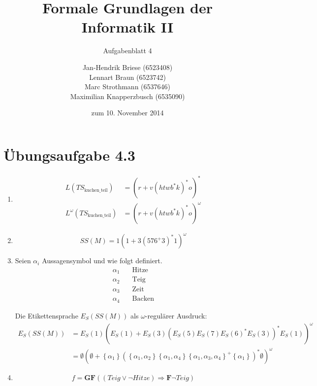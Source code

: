 \documentclass[a4paper]{scrartcl}
\title{Formale Grundlagen der Informatik II}
\subtitle{Aufgabenblatt 4}
\author{
    Jan-Hendrik Briese (6523408) \\
    Lennart Braun (6523742) \\
    Marc Strothmann (6537646) \\
    Maximilian Knapperzbusch (6535090)
}
\date{zum 10. November 2014}
\begin{document}
\maketitle

\section*{Übungsaufgabe 4.3} 
\begin{enumerate}
    \item
        \begin{align*}
            L(TS_\text{kuchen\_teil}) &= \left( r + v \left( htwb^*k \right)^* o \right)^* \\
            L^\omega(TS_\text{kuchen\_teil}) &= \left( r + v \left( htwb^*k \right)^* o \right)^\omega
        \end{align*}

    \item
        \begin{equation*}
            SS(M) = 1 \left( 1 + 3 \left( 576^+3 \right)^* 1 \right)^\omega
        \end{equation*}

    \item Seien $\alpha_i$ Aussagensymbol und wie folgt definiert.
        \begin{align*}
            \alpha_1 &\quad \text{Hitze} \\
            \alpha_2 &\quad \text{Teig} \\
            \alpha_3 &\quad \text{Zeit} \\
            \alpha_4 &\quad \text{Backen}
        \end{align*}

        Die Etikettensprache $E_S(SS(M))$ als $\omega$-regulärer Ausdruck:
        \begin{equation*}
            \begin{split}
                E_S(SS(M)) &= E_S(1) \left( E_S(1) + E_S(3) \left( E_S(5) E_S(7) E_S(6)^* E_S(3) \right)^* E_S(1) \right)^\omega \\
                &= \emptyset \left( \emptyset + \left\{ \alpha_1 \right\} \left( \left\{ \alpha_1, \alpha_2 \right\} \left\{ \alpha_1, \alpha_4 \right\} \left\{ \alpha_1, \alpha_3, \alpha_4 \right\}^+ \left\{ \alpha_1 \right\} \right)^* \emptyset \right)^\omega
            \end{split}
        \end{equation*}

    \item
        \begin{equation}
            f = \textbf{GF}((Teig \lor \lnot Hitze) \Rightarrow \textbf{F}\lnot Teig)
        \end{equation}
        

\end{enumerate}
\end{document}

